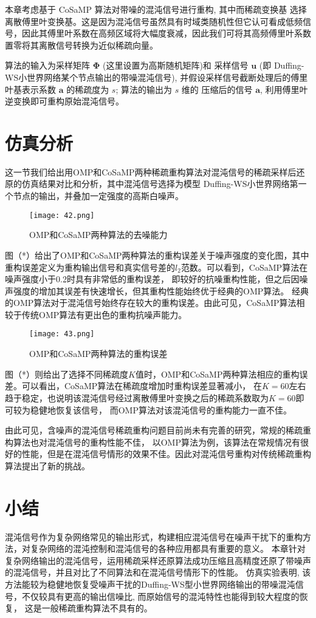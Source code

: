 本章考虑基于 CoSaMP 算法对带噪的混沌信号进行重构, 其中而稀疏变换基 选择离散傅里叶变换基。这是因为混沌信号虽然具有时域类随机性但它认可看成低频信号，因此其傅里叶系数在高频区域将大幅度衰减，因此我们可将其高频傅里叶系数置零将其离散信号转换为近似稀疏向量。

算法的输入为采样矩阵 $\boldsymbol{\Phi}$ (这里设置为高斯随机矩阵)和 采样信号 $\boldsymbol{u}$
(即 Duffing-WS小世界网络某个节点输出的带噪混沌信号), 并假设采样信号截断处理后的傅里叶基表示系数 $\boldsymbol{a}$
的稀疏度为 $s$; 算法的输出为 $s$ 维的 压缩后的信号 $\boldsymbol{a}$, 利用傅里叶逆变换即可重构原始混沌信号。


\section{仿真分析}
这一节我们给出用OMP和CoSaMP两种稀疏重构算法对混沌信号的稀疏采样后还原的仿真结果对比和分析，其中混沌信号选择为模型
Duffing-WS小世界网络第一个节点的输出，并叠加一定强度的高斯白噪声。\par
\begin{figure}[!htbp]
    \centering
    \texttt{[image: 42.png]}
    \caption{OMP和CoSaMP两种算法的去噪能力}
\end{figure}
图（*）给出了OMP和CoSaMP两种算法的重构误差关于噪声强度的变化图，其中重构误差定义为重构输出信号和真实信号差的$l_2$范数。可以看到，CoSaMP算法在噪声强度小于0.2时具有非常低的重构误差，
即较好的抗噪重构性能，但之后因噪声强度的增加其误差有快速增长，但其重构性能始终优于经典的OMP算法。
经典的OMP算法对于混沌信号始终存在较大的重构误差。由此可见，CoSaMP算法相较于传统OMP算法有更出色的重构抗噪声能力。\par
\begin{figure}[!htbp]
    \centering
    \texttt{[image: 43.png]}
    \caption{OMP和CoSaMP两种算法的重构误差}
\end{figure}

图（*）则给出了选择不同稀疏度$K$值时，OMP和CoSaMP两种算法相应的重构误差。可以看出，CoSaMP算法在稀疏度增加时重构误差显著减小，
在$K = 60$左右趋于稳定，也说明该混沌信号经过离散傅里叶变换之后的稀疏系数取为$K = 60$即可较为稳健地恢复该信号，
而OMP算法对该混沌信号的重构能力一直不佳。\par
由此可见，含噪声的混沌信号稀疏重构问题目前尚未有完善的研究，常规的稀疏重构算法也对混沌信号的重构性能不佳，
以OMP算法为例，该算法在常规情况有很好的性能，但是在混沌信号情形的效果不佳。因此对混沌信号重构对传统稀疏重构算法提出了新的挑战。
\section{小结}
混沌信号作为复杂网络常见的输出形式，构建相应混沌信号在噪声干扰下的重构方法，对复杂网络的混沌控制和混沌信号的各种应用都具有重要的意义。
本章针对复杂网络输出的混沌信号，运用稀疏采样还原算法成功压缩且高精度还原了带噪声的混沌信号，并且对比了不同算法和在混沌信号情形下的性能。
仿真实验表明, 该方法能较为稳健地恢复受噪声干扰的Duffing-WS型小世界网络输出的带噪混沌信号，不仅较具有更高的输出信噪比, 而原始信号的混沌特性也能得到较大程度的恢复，
这是一般稀疏重构算法不具有的。